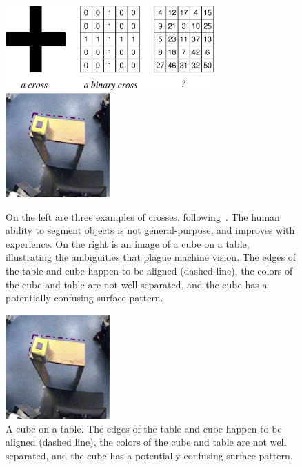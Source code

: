 %
\begin{figure}[tb]
\begin{center}
\includegraphics[width=8.0cm]{number-cross.eps}
\hspace{2cm}
\includegraphics[width=4cm]{setup-sequence.eps}
\caption{ 
\label{fig:number-cross}
%
On the left are three examples of crosses,
following~\cite{manzotti01coscienza}.  The human ability to segment
objects is not general-purpose, and improves with experience.
On the right is an image of a cube on a table, illustrating the
ambiguities that plague machine vision. 
The edges of the table and cube happen to be
aligned (dashed line), the colors of the cube and table are not well
separated, and the cube has a potentially confusing surface pattern.
%
}
\end{center}
\end{figure}
%
%

\ifverbose
\begin{figure}[tb]
\begin{center}
\includegraphics[width=4cm]{setup-sequence.eps}
\caption{ 
\label{fig:setup-sequence}
A cube on a table. The edges of the table and cube happen to be
aligned (dashed line), the colors of the cube and table are not well
separated, and the cube has a potentially confusing surface pattern.
}
\end{center}
\end{figure}
\fi

